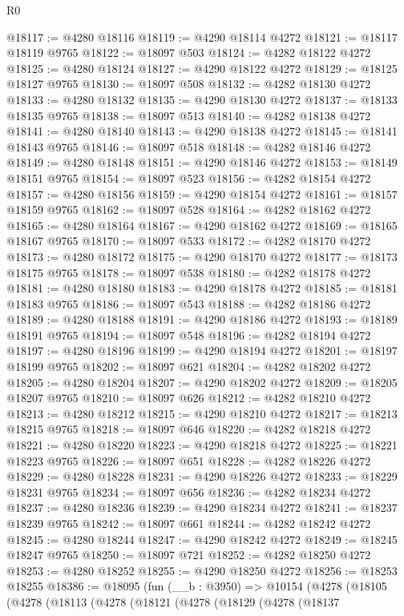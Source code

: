 \begin{lexlean}{R0}
\begin{coremodule}
@18117 := @4280 @18116
@18119 := @4290 @18114 @4272
@18121 := @18117 @18119 @9765
@18122 := @18097 @503
@18124 := @4282 @18122 @4272
@18125 := @4280 @18124
@18127 := @4290 @18122 @4272
@18129 := @18125 @18127 @9765
@18130 := @18097 @508
@18132 := @4282 @18130 @4272
@18133 := @4280 @18132
@18135 := @4290 @18130 @4272
@18137 := @18133 @18135 @9765
@18138 := @18097 @513
@18140 := @4282 @18138 @4272
@18141 := @4280 @18140
@18143 := @4290 @18138 @4272
@18145 := @18141 @18143 @9765
@18146 := @18097 @518
@18148 := @4282 @18146 @4272
@18149 := @4280 @18148
@18151 := @4290 @18146 @4272
@18153 := @18149 @18151 @9765
@18154 := @18097 @523
@18156 := @4282 @18154 @4272
@18157 := @4280 @18156
@18159 := @4290 @18154 @4272
@18161 := @18157 @18159 @9765
@18162 := @18097 @528
@18164 := @4282 @18162 @4272
@18165 := @4280 @18164
@18167 := @4290 @18162 @4272
@18169 := @18165 @18167 @9765
@18170 := @18097 @533
@18172 := @4282 @18170 @4272
@18173 := @4280 @18172
@18175 := @4290 @18170 @4272
@18177 := @18173 @18175 @9765
@18178 := @18097 @538
@18180 := @4282 @18178 @4272
@18181 := @4280 @18180
@18183 := @4290 @18178 @4272
@18185 := @18181 @18183 @9765
@18186 := @18097 @543
@18188 := @4282 @18186 @4272
@18189 := @4280 @18188
@18191 := @4290 @18186 @4272
@18193 := @18189 @18191 @9765
@18194 := @18097 @548
@18196 := @4282 @18194 @4272
@18197 := @4280 @18196
@18199 := @4290 @18194 @4272
@18201 := @18197 @18199 @9765
@18202 := @18097 @621
@18204 := @4282 @18202 @4272
@18205 := @4280 @18204
@18207 := @4290 @18202 @4272
@18209 := @18205 @18207 @9765
@18210 := @18097 @626
@18212 := @4282 @18210 @4272
@18213 := @4280 @18212
@18215 := @4290 @18210 @4272
@18217 := @18213 @18215 @9765
@18218 := @18097 @646
@18220 := @4282 @18218 @4272
@18221 := @4280 @18220
@18223 := @4290 @18218 @4272
@18225 := @18221 @18223 @9765
@18226 := @18097 @651
@18228 := @4282 @18226 @4272
@18229 := @4280 @18228
@18231 := @4290 @18226 @4272
@18233 := @18229 @18231 @9765
@18234 := @18097 @656
@18236 := @4282 @18234 @4272
@18237 := @4280 @18236
@18239 := @4290 @18234 @4272
@18241 := @18237 @18239 @9765
@18242 := @18097 @661
@18244 := @4282 @18242 @4272
@18245 := @4280 @18244
@18247 := @4290 @18242 @4272
@18249 := @18245 @18247 @9765
@18250 := @18097 @721
@18252 := @4282 @18250 @4272
@18253 := @4280 @18252
@18255 := @4290 @18250 @4272
@18256 := @18253 @18255
@18386 := @18095
    (fun (__b : @3950) =>
    @10154
      (@4278
        (@18105
          (@4278
            (@18113
              (@4278
                (@18121
                  (@4278
                    (@18129
                      (@4278
                        (@18137

\end{coremodule}
\end{lexlean}
